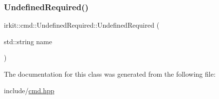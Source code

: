 \subsubsection{\texorpdfstring{Undefined\+Required()}{UndefinedRequired()}}
{\footnotesize\ttfamily irkit\+::cmd\+::\+Undefined\+Required\+::\+Undefined\+Required (\begin{DoxyParamCaption}\item[{std\+::string}]{name }\end{DoxyParamCaption})\hspace{0.3cm}{\ttfamily [inline]}}



The documentation for this class was generated from the following file\+:\begin{DoxyCompactItemize}
\item 
include/\mbox{\hyperlink{cmd_8hpp}{cmd.\+hpp}}\end{DoxyCompactItemize}
